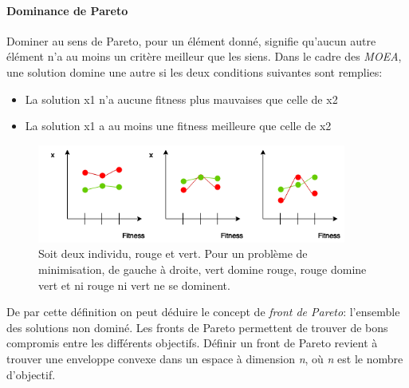 \documentclass[french, 11pt]{memoir}
\begin{document}
\paragraph{Dominance de Pareto}\label{dominance-de-pareto}

Dominer au sens de Pareto\cite{voorneveld2003characterization}, pour un élément donné, signifie qu'aucun
autre élément n'a au moins un critère meilleur que les siens. Dans le
cadre des \emph{MOEA}, une solution domine une autre si les deux
conditions suivantes sont remplies:

\begin{itemize}
\item
  La solution x1 n'a aucune fitness plus mauvaises que celle de x2
\item
  La solution x1 a au moins une fitness meilleure que celle de x2
\end{itemize}

\begin{figure}[htbp]
	\begin{center}
		\includegraphics[width=4in]{img/paretoDominance.png}
		\caption{Soit deux individu, rouge et vert. Pour un problème de minimisation, de gauche à droite, vert domine rouge, rouge domine vert et ni rouge ni vert ne se dominent.}
	\end{center}
\end{figure}



De par cette définition on peut déduire le concept de \emph{front de
Pareto}: l'ensemble des solutions non dominé. Les fronts de Pareto
permettent de trouver de bons compromis entre les différents objectifs.
Définir un front de Pareto revient à trouver une enveloppe convexe\cite{godfrey2007algorithms} dans
un espace à dimension \textit{n}, où \textit{n} est le nombre d'objectif.
\end{document}
